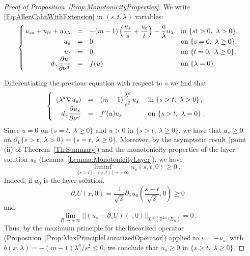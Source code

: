 \documentclass[twoside,leqno,symbols-for-thanks, draft]{rmi}
\numberwithin{equation}{section}
\theoremstyle{definition}
\newcommand{\con}[1]{\mathbb{#1}}
\newcommand{\R}{\con{R}} %
\newcommand{\norm}[1]{\left | \left |{#1} \right | \right |}
\newcommand{\s}{\gamma}
\newcommand{\bpar}[1]{\left ( {#1}\right )}
\newcommand\beqc[1]{\left\{\begin{array}{#1}}
\newcommand\eeqc{\end{array} \right.}
\def\PDEsystem{rcll}
\let\div\relax
\DeclareMathOperator{\div}{div}
\begin{document}
\begin{proof}[Proof of Proposition~\ref{Prop:MonotonicityProperties}]
	We write \eqref{Eq:AllenCahnWithExtension} in $(s,t,\lambda)$ variables:
	\begin{equation}
	\label{Eq:AllenCahnEithExtensionST}
	\beqc{\PDEsystem}
	\! \! u_{ss} + u_{tt} + u_{\lambda \lambda}  & = & -  (m-1)\bpar{\dfrac{u_s}{s} + \dfrac{u_t}{t}}  - \dfrac{a}{\lambda} u_\lambda  & \text{in } \{st>0,\ \lambda > 0\},\! \! \! \!  \\
		\vspace{1mm}
	u_s & = & 0& \text{on } \{s=0, \ \lambda \geq 0 \},\! \! \! \!  \\
	u_t& = & 0& \text{on } \{t=0, \ \lambda \geq 0 \},\! \! \! \!  \\
	d_\s \dfrac{\partial u}{\partial \nu^a}& = & f(u)& \text{on } \{\lambda = 0\}.\! \! \! \! 
	\eeqc
	\end{equation}
	
	Differentiating the previous equation with respect to $s$ we find that
	$$
	\beqc{\PDEsystem}
	\div (\lambda^a \nabla u_s) &=& (m-1) \dfrac{\lambda^a}{s^2}u_s & \text{ in } \{s>t,\ \lambda > 0\}\,, \\
	d_\s \dfrac{\partial u_s}{\partial \nu^a}& = & f'(u)u_s& \text{ on } \{s>t,\ \lambda = 0\}\,.
	\eeqc
	$$
	Since $u = 0$ on $\{s = t,\ \lambda \geq 0 \}$ and $u>0$ in $\{s > t,\ \lambda \geq 0 \}$, we have that $u_s \geq 0$ on $\partial_L \{s>t,\ \lambda > 0 \} =\{s = t,\ \lambda \geq 0 \}$. Moreover, by the asymptotic result (point (ii) of Theorem~\ref{Th:Summary}) and the monotonicity properties of the layer solution $u_0$ (Lemma~\ref{Lemma:MonotonicityLayer}), we have
	$$
	\liminf_{\{s>t\} ,\ |(s,t)|\to +\infty} u_s(s,t,0) \geq 0\,.
	$$
	Indeed, if $u_0$ is the layer solution, 
	$$
	\partial_s U (x,0) = \dfrac{1}{\sqrt{2}} \partial_x u_0\bpar{\dfrac{s-t}{\sqrt{2}}, 0} \geq 0 
	$$
	and 
	$$
	\lim_{R\to +\infty} \norm{(u_s- \partial_s U)(\cdot,0)}_{L^\infty(\R^{2m}\setminus B_{R})} = 0\,.
	$$
	Thus, by the maximum principle for the linearized operator (Proposition~\ref{Prop:MaxPrincipleLinearizedOperator}) applied to $v=-u_s$, with $b(x,\lambda) = -(m-1)\lambda^a / s^2\leq 0$, we conclude that $u_s \geq 0$ in $\{s \geq t,\ \lambda \geq 0\}$.
	

\end{proof}
\end{document}
